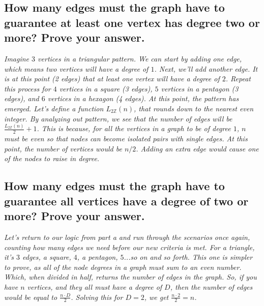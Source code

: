 \documentclass{article}
\begin{document}
\subsection{How many edges must the graph have to guarantee at least one vertex has degree
    two or more? Prove your answer.}
\hspace{1cm}\textit{Imagine $3$ vertices in a triangular pattern. We can start by adding one
    edge, which means two vertices will have a degree of $1$. Next, we'll add another edge. It
    is at this point (2 edges) that at least one vertex will have a degree of $2$. Repeat this process for
    $4$ vertices in a square (3 edges), $5$ vertices in a pentagon (3 edges), and $6$ vertices in
    a hexagon (4 edges). At this point, the pattern has emerged. Let's define a function $L_{2\mathbb{Z}}(n)$,
    that rounds down to the nearest even integer. By analyzing out pattern, we see that the number of edges
    will be $\frac{L_{2\mathbb{Z}}(n)}{2}+1$. This is because, for all the vertices in a graph to be of degree $1$,
    $n$ must be even so that nodes can become isolated pairs with single edges. At this point, the number of
    vertices would be $n/2$. Adding an extra edge would cause one of the nodes to raise in degree.}
\subsection{How many edges must the graph have to guarantee all vertices have a degree of
    two or more? Prove your answer.}
\hspace{1cm}\textit{Let's return to our logic from part a and run through the scenarios once again,
    counting how many edges we need before our new criteria is met. For a triangle, it's $3$ edges,
    a square, $4$, a pentagon, $5$...so on and so forth. This one is simpler to prove, as all of the
    node degrees in a graph must sum to an even number. Which, when divided in half, returns the number
    of edges in the graph. So, if you have $n$ vertices, and they all must have a degree of $D$, then the
    number of edges would be equal to $\frac{n\cdot D}{2}$. Solving this for $D=2$, we get $\frac{n\cdot 2}{2} = n$.}
\end{document}
